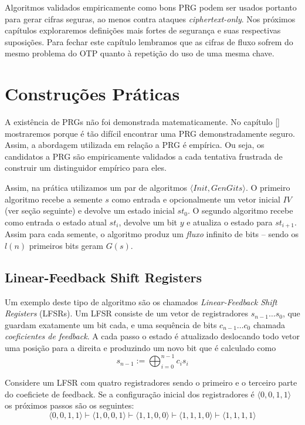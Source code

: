 Algoritmos validados empiricamente como bons PRG podem ser usados portanto para gerar cifras seguras, ao menos contra ataques {\em ciphertext-only}.
Nos próximos capítulos exploraremos definições mais fortes de segurança e suas respectivas suposições.
Para fechar este capítulo lembramos que as cifras de fluxo sofrem do mesmo problema do OTP quanto à repetição do uso de uma mesma chave.

\section{Construções Práticas}
\label{sec:construcoes-praticas}

A existência de PRGs não foi demonstrada matematicamente.
No capítulo \ref{} mostraremos porque é tão difícil encontrar uma PRG demonstradamente seguro.
Assim, a abordagem utilizada em relação a PRG é empírica.
Ou seja, os candidatos a PRG são empiricamente validados a cada tentativa frustrada de construir um distinguidor empírico para eles.

Assim, na prática utilizamos um par de algoritmos $\langle Init, GenGits \rangle$.
O primeiro algoritmo recebe a semente $s$ como entrada e opcionalmente um vetor inicial $IV$ (ver seção seguinte) e devolve um estado inicial $st_0$.
O segundo algoritmo recebe como entrada o estado atual $st_i$, devolve um bit $y$ e atualiza o estado para $st_{i+1}$.
Assim para cada semente, o algoritmo produz um {\em fluxo} infinito de bits -- sendo os $l(n)$ primeiros bits geram $G(s)$.

\subsection{Linear-Feedback Shift Registers}
\label{sec:lfsr}

Um exemplo deste tipo de algoritmo são os chamados {\em Linear-Feedback Shift Registers} (LFSRs).
Um LFSR consiste de um vetor de registradores $s_{n-1} \dots s_0$, que guardam exatamente um bit cada, e uma sequência de bits $c_{n-1} \dots c_0$ chamada {\em coeficientes de feedback}.
A cada passo o estado é atualizado deslocando todo vetor uma posição para a direita e produzindo um novo bit que é calculado como
\begin{displaymath}
s_{n-1} := \bigoplus_{i=0}^{n-1}c_is_i  
\end{displaymath}

\begin{example}
  Considere um LFSR com quatro registradores sendo o primeiro e o terceiro parte do coeficiete de feedback.
Se a configuração inicial dos registradores é $\langle 0,0,1,1 \rangle$ os próximos passos são os seguintes:
\begin{displaymath}
  \langle 0,0,1,1 \rangle \vdash
  \langle 1,0,0,1 \rangle \vdash 
  \langle 1,1,0,0 \rangle \vdash
  \langle 1,1,1,0 \rangle \vdash
  \langle 1,1,1,1 \rangle
\end{displaymath}
\end{example}


